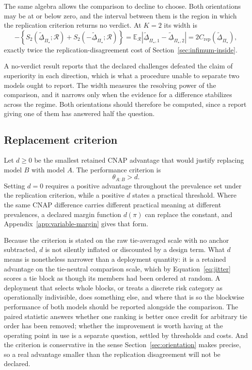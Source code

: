 \documentclass[11pt]{article}
\newcommand{\Regime}{\mathcal{R}}
\newcommand{\PSet}{\Pi_\star}
\newcommand{\E}{\mathbb{E}}
\newcommand{\RobDta}{\underline{\widetilde{\Delta}}_{\PSet}}
\theoremstyle{remark}
\begin{document}
The same algebra allows the comparison to decline to choose. Both orientations may be at or below zero, and the interval between them is the region in which the replication criterion returns no verdict. At $K=2$ its width is
\[
-\left\{
S_2(\RobDta;\Regime)+S_2(-\RobDta;\Regime)
\right\}
=
\E_{\Regime}
\left|
\underline{\widetilde{\Delta}}_{\PSet,1}
-
\underline{\widetilde{\Delta}}_{\PSet,2}
\right|
=
2C_{\mathrm{rep}}(\RobDta),
\]
exactly twice the replication-disagreement cost of Section~\ref{sec:infimum-inside}.

A no-verdict result reports that the declared challenges defeated the claim of superiority in each direction, which is what a procedure unable to separate two models ought to report. The width measures the resolving power of the comparison, and it narrows only when the evidence for a difference stabilizes across the regime. Both orientations should therefore be computed, since a report giving one of them has answered half the question.

\subsection{Replacement criterion}
\label{sec:replacement}

Let $d\geq0$ be the smallest retained CNAP advantage that would justify replacing model $B$ with model $A$. The performance criterion is
\begin{equation}
\theta_{A:B}>d.
\label{eq:replacement}
\end{equation}
Setting $d=0$ requires a positive advantage throughout the prevalence set under the replication criterion, while a positive $d$ states a practical threshold. Where the same CNAP difference carries different practical meaning at different prevalences, a declared margin function $d(\pi)$ can replace the constant, and Appendix~\ref{app:variable-margin} gives that form.

Because the criterion is stated on the raw tie-averaged scale with no anchor subtracted, $d$ is not silently inflated or discounted by a design term. What $d$ means is nonetheless narrower than a deployment quantity: it is a retained advantage on the tie-neutral comparison scale, which by Equation~\eqref{eq:jitter} scores a tie block as though its members had been ordered at random. A deployment that selects whole blocks, or treats a discrete risk category as operationally indivisible, does something else, and where that is so the blockwise performance of both models should be reported alongside the comparison. The paired statistic answers whether one ranking is better once credit for arbitrary tie order has been removed; whether the improvement is worth having at the operating point in use is a separate question, settled by thresholds and costs. And the criterion is conservative in the sense Section~\ref{sec:orientation} makes precise, so a real advantage smaller than the replication disagreement will not be declared.
\end{document}
